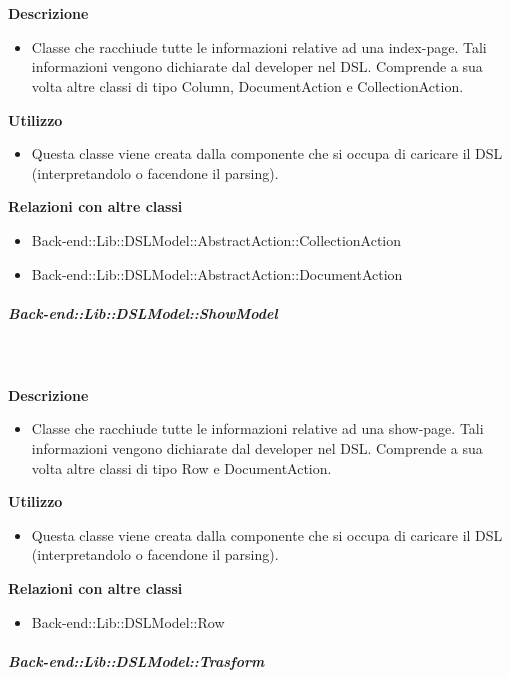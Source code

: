         \textbf{\\ \\ Descrizione} 
          \begin{itemize}
            \item[] Classe che racchiude tutte le informazioni relative ad una index-page. Tali informazioni vengono dichiarate dal developer nel DSL. Comprende a sua volta altre classi di tipo Column, DocumentAction e CollectionAction.
          \end{itemize}      
        \textbf{Utilizzo}  
          \begin{itemize}
            \item[] Questa classe viene creata dalla componente che si occupa di caricare il DSL (interpretandolo o facendone il parsing).
          \end{itemize}
          \textbf{Relazioni con altre classi}
          \begin{itemize}
              \item{Back-end::Lib::DSLModel::AbstractAction::CollectionAction}
              \item{Back-end::Lib::DSLModel::AbstractAction::DocumentAction}
          \end{itemize}
      \subparagraph{Back-end::Lib::DSLModel::ShowModel}
        
        \textbf{\\ \\ Descrizione} 
          \begin{itemize}
            \item[] Classe che racchiude tutte le informazioni relative ad una show-page. 
Tali informazioni vengono dichiarate dal developer nel DSL. 
Comprende a sua volta altre classi di tipo Row e DocumentAction.
          \end{itemize}      
        \textbf{Utilizzo}  
          \begin{itemize}
            \item[] Questa classe viene creata dalla componente che si occupa di caricare il DSL (interpretandolo o facendone il parsing).
          \end{itemize}
          \textbf{Relazioni con altre classi}
          \begin{itemize}
              \item{Back-end::Lib::DSLModel::Row}
          \end{itemize}
      \subparagraph{Back-end::Lib::DSLModel::Trasform}
        
